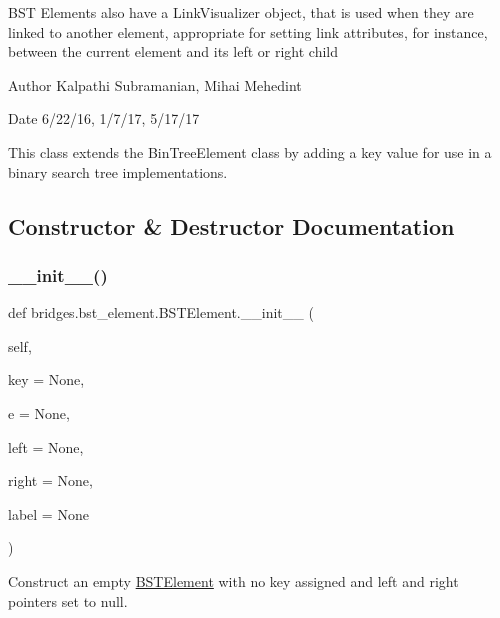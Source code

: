 B\+ST Elements also have a Link\+Visualizer object, that is used when they are linked to another element, appropriate for setting link attributes, for instance, between the current element and its left or right child

\begin{DoxyAuthor}{Author}
Kalpathi Subramanian, Mihai Mehedint
\end{DoxyAuthor}
\begin{DoxyDate}{Date}
6/22/16, 1/7/17, 5/17/17
\end{DoxyDate}
This class extends the Bin\+Tree\+Element class by adding a \textquotesingle{}key\textquotesingle{} value for use in a binary search tree implementations. 

\subsection{Constructor \& Destructor Documentation}
\mbox{\label{classbridges_1_1bst__element_1_1_b_s_t_element_ab19a9e72468cca41b601489dc17812a7}} 
\subsubsection{\texorpdfstring{\+\_\+\+\_\+init\+\_\+\+\_\+()}{\_\_init\_\_()}}
{\footnotesize\ttfamily def bridges.\+bst\+\_\+element.\+B\+S\+T\+Element.\+\_\+\+\_\+init\+\_\+\+\_\+ (\begin{DoxyParamCaption}\item[{}]{self,  }\item[{}]{key = {\ttfamily None},  }\item[{}]{e = {\ttfamily None},  }\item[{}]{left = {\ttfamily None},  }\item[{}]{right = {\ttfamily None},  }\item[{}]{label = {\ttfamily None} }\end{DoxyParamCaption})}



Construct an empty \mbox{\hyperlink{classbridges_1_1bst__element_1_1_b_s_t_element}{B\+S\+T\+Element}} with no key assigned and left and right pointers set to null. 


